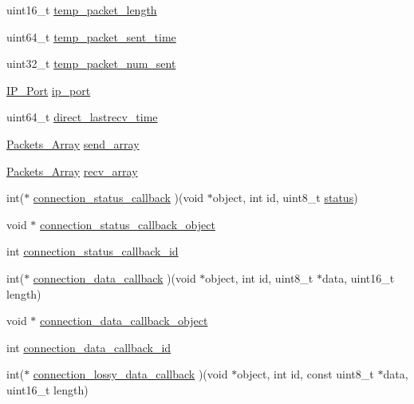\begin{DoxyCompactItemize}
uint16\+\_\+t \hyperlink{struct_crypto___connection_a4ef842580c6c073f36578d0e07551cc4}{temp\+\_\+packet\+\_\+length}
\item 
uint64\+\_\+t \hyperlink{struct_crypto___connection_abb5fdaef769d667f90bc97bd72d765d6}{temp\+\_\+packet\+\_\+sent\+\_\+time}
\item 
uint32\+\_\+t \hyperlink{struct_crypto___connection_a7386b7ad7bedb9dd47d898f588b4f463}{temp\+\_\+packet\+\_\+num\+\_\+sent}
\item 
\hyperlink{struct_i_p___port}{I\+P\+\_\+\+Port} \hyperlink{struct_crypto___connection_a86e2a5a56c0dd22df6e8b8a10e40f9e4}{ip\+\_\+port}
\item 
uint64\+\_\+t \hyperlink{struct_crypto___connection_ac6eb8a274b0dedea83359f2d9269cbc2}{direct\+\_\+lastrecv\+\_\+time}
\item 
\hyperlink{struct_packets___array}{Packets\+\_\+\+Array} \hyperlink{struct_crypto___connection_aa9112ee7e76eb3e870491f7c5c272197}{send\+\_\+array}
\item 
\hyperlink{struct_packets___array}{Packets\+\_\+\+Array} \hyperlink{struct_crypto___connection_a1a62bc0c4bb9e349735c65f9948020d5}{recv\+\_\+array}
\item 
int($\ast$ \hyperlink{struct_crypto___connection_ad3c663c15ca97b75951ea711b522c049}{connection\+\_\+status\+\_\+callback} )(void $\ast$object, int id, uint8\+\_\+t \hyperlink{struct_crypto___connection_ade818037fd6c985038ff29656089758d}{status})
\item 
void $\ast$ \hyperlink{struct_crypto___connection_afe03d43c62ac2aa575a39e4308353244}{connection\+\_\+status\+\_\+callback\+\_\+object}
\item 
int \hyperlink{struct_crypto___connection_a3cd6f7015115dc493f86be91526eb9f8}{connection\+\_\+status\+\_\+callback\+\_\+id}
\item 
int($\ast$ \hyperlink{struct_crypto___connection_adc6ee264e4a5758049c6299beb81ce6d}{connection\+\_\+data\+\_\+callback} )(void $\ast$object, int id, uint8\+\_\+t $\ast$data, uint16\+\_\+t length)
\item 
void $\ast$ \hyperlink{struct_crypto___connection_a3c44dfac7528ae10a6d09bf812f36486}{connection\+\_\+data\+\_\+callback\+\_\+object}
\item 
int \hyperlink{struct_crypto___connection_a7d50567cce6cb1b8ef983e64060d414e}{connection\+\_\+data\+\_\+callback\+\_\+id}
\item 
int($\ast$ \hyperlink{struct_crypto___connection_ab5af8aad05ddc085e69ead928cc26313}{connection\+\_\+lossy\+\_\+data\+\_\+callback} )(void $\ast$object, int id, const uint8\+\_\+t $\ast$data, uint16\+\_\+t length)

\end{DoxyCompactItemize}
